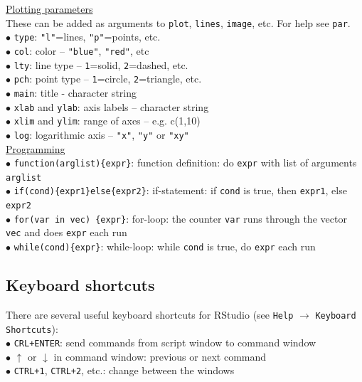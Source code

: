 \documentclass[a4paper,11pt,twocolumn,tablecaptionabove]{scrartcl} %
\begin{document}
\noindent \underline{Plotting parameters}\\
These can be added as arguments to \texttt{plot}, \texttt{lines}, \texttt{image}, etc. For help see \texttt{par}.\\
$\bullet$ \texttt{type}: \texttt{"l"}=lines, \texttt{"p"}=points, etc.\\
$\bullet$ \texttt{col}: color -- \texttt{"blue"}, \texttt{"red"}, etc\\
$\bullet$ \texttt{lty}: line type -- \texttt{1}=solid, \texttt{2}=dashed, etc.\\
$\bullet$ \texttt{pch}: point type -- \texttt{1}=circle, \texttt{2}=triangle, etc.\\
$\bullet$ \texttt{main}: title - character string\\
$\bullet$ \texttt{xlab} and \texttt{ylab}: axis labels -- character string\\
$\bullet$ \texttt{xlim} and \texttt{ylim}: range of axes -- e.g. c(1,10)\\ 
$\bullet$ \texttt{log}: logarithmic axis -- \texttt{"x"}, \texttt{"y"} or \texttt{"xy"}\\

\noindent \underline{Programming}\\
$\bullet$ \verb!function(arglist){expr}!: function definition: do \texttt{expr} with list of arguments \texttt{arglist} \\ 
$\bullet$ \verb!if(cond){expr1}else{expr2}!: if-statement: if \texttt{cond} is true, then \texttt{expr1}, else \texttt{expr2} \\
$\bullet$ \verb!for(var in vec) {expr}!: for-loop: the counter \texttt{var} runs through the vector \texttt{vec} and does \texttt{expr} each run\\
$\bullet$ \verb!while(cond){expr}!: while-loop: while \texttt{cond} is true, do \texttt{expr} each run\\

\subsection{Keyboard shortcuts}

There are several useful keyboard shortcuts for RStudio (see \texttt{Help} $\rightarrow$ \texttt{Keyboard Shortcuts}):\\
$\bullet$ \texttt{CRL+ENTER}: send commands from script window to command window\\
$\bullet$ $\uparrow$ or $\downarrow$ in command window: previous or next command\\
$\bullet$ \texttt{CTRL+1}, \texttt{CTRL+2}, etc.: change between the windows\\
\end{document}
